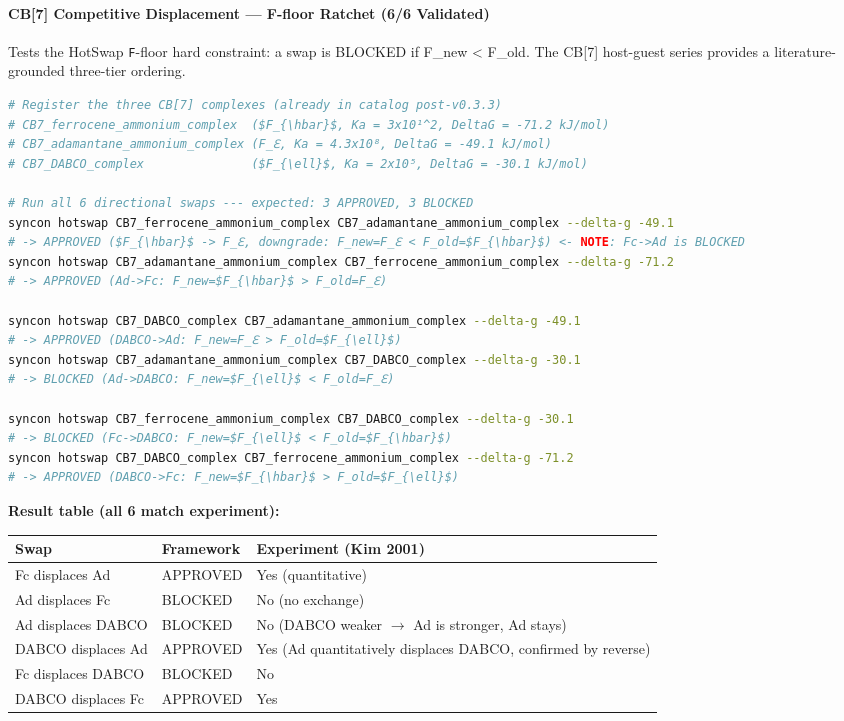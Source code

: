 \documentclass[12pt,a4paper]{article}
\begin{document}
\paragraph{CB{[}7{]} Competitive Displacement --- F-floor Ratchet (6/6 Validated)}

Tests the HotSwap \texttt{F}-floor hard constraint: a swap is BLOCKED if F\_new \textless{} F\_old. The CB{[}7{]} host-guest series provides a literature-grounded three-tier ordering.

\begin{lstlisting}[language=bash]
# Register the three CB[7] complexes (already in catalog post-v0.3.3)
# CB7_ferrocene_ammonium_complex  ($F_{\hbar}$, Ka = 3x10¹^2, DeltaG = -71.2 kJ/mol)
# CB7_adamantane_ammonium_complex (F_ℇ, Ka = 4.3x10⁸, DeltaG = -49.1 kJ/mol)
# CB7_DABCO_complex               ($F_{\ell}$, Ka = 2x10⁵, DeltaG = -30.1 kJ/mol)

# Run all 6 directional swaps --- expected: 3 APPROVED, 3 BLOCKED
syncon hotswap CB7_ferrocene_ammonium_complex CB7_adamantane_ammonium_complex --delta-g -49.1
# -> APPROVED ($F_{\hbar}$ -> F_ℇ, downgrade: F_new=F_ℇ < F_old=$F_{\hbar}$) <- NOTE: Fc->Ad is BLOCKED
syncon hotswap CB7_adamantane_ammonium_complex CB7_ferrocene_ammonium_complex --delta-g -71.2
# -> APPROVED (Ad->Fc: F_new=$F_{\hbar}$ > F_old=F_ℇ)

syncon hotswap CB7_DABCO_complex CB7_adamantane_ammonium_complex --delta-g -49.1
# -> APPROVED (DABCO->Ad: F_new=F_ℇ > F_old=$F_{\ell}$)
syncon hotswap CB7_adamantane_ammonium_complex CB7_DABCO_complex --delta-g -30.1
# -> BLOCKED (Ad->DABCO: F_new=$F_{\ell}$ < F_old=F_ℇ)

syncon hotswap CB7_ferrocene_ammonium_complex CB7_DABCO_complex --delta-g -30.1
# -> BLOCKED (Fc->DABCO: F_new=$F_{\ell}$ < F_old=$F_{\hbar}$)
syncon hotswap CB7_DABCO_complex CB7_ferrocene_ammonium_complex --delta-g -71.2
# -> APPROVED (DABCO->Fc: F_new=$F_{\hbar}$ > F_old=$F_{\ell}$)
\end{lstlisting}

\textbf{Result table (all 6 match experiment):}

\begin{table}[htbp]
\centering
\small
{}
\begin{tabularx}{\textwidth}{>{\centering\arraybackslash}X >{\centering\arraybackslash}X >{\centering\arraybackslash}X}
\toprule
\rowcolor{gray!25}\textbf{Swap} & \textbf{Framework} & \textbf{Experiment (Kim 2001)} \\
\midrule
\rowcolors{1}{white}{gray!10}
Fc displaces Ad & APPROVED & Yes (quantitative) \\
Ad displaces Fc & BLOCKED & No (no exchange) \\
Ad displaces DABCO & BLOCKED & No (DABCO weaker $\rightarrow$ Ad is stronger, Ad stays) \\
DABCO displaces Ad & APPROVED & Yes (Ad quantitatively displaces DABCO, confirmed by reverse) \\
Fc displaces DABCO & BLOCKED & No \\
DABCO displaces Fc & APPROVED & Yes \\
\bottomrule
\end{tabularx}
\end{table}
\end{document}
